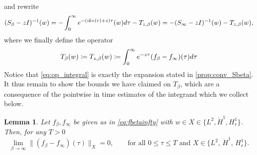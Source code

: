 \documentclass[11pt,reqno]{amsproc}
\def\dd{{\rm d}}
\def\e{{\rm e}}
\newtheorem{lemma}[proposition]{Lemma}
\theoremstyle{definition}
\newtheorem{remark}[proposition]{Remark}
\theoremstyle{definition}
\numberwithin{equation}{section}
\begin{document}
and rewrite  
\begin{equation}
\label{eq:op_integral}
(S_\beta-z I)^{-1}(w)=-\int_0^{\infty}\e^{-(ikv(r)+z)\tau}(w) \dd \tau-T_{z,\beta}(w)=-(S_\infty-zI)^{-1}(w)-T_{z,\beta}(w),
\end{equation}
where we finally define the operator
\begin{equation}
\label{def:T_beta}
    T_{\beta}(w)\coloneqq T_{z,\beta}(w)\coloneqq\int_0^{\infty}\e^{-z\tau}
({f}_\beta-f_\infty)(\tau)\dd \tau
\end{equation}
Notice that \cref{eq:op_integral} is exactly the expansion stated in \cref{prop:conv_Sbeta}. 
It thus remain to show the bounds we have claimed on $T_{\beta}$, which are a consequence of the pointwise in time estimates of the integrand which we collect below. 
\begin{lemma}
\label{lemma:small_tau}
    Let $f_\beta, f_\infty$ be given as in \cref{eq:fbetainfty} with $w\in X\in \{L^2,\dot{H}^1,H^1_r\}$. Then, for any $T>0$ 
    \begin{equation}
        \lim_{\beta\to \infty}\|(f_\beta-f_\infty)(\tau)\|_{X}=0, \qquad \text{for all } 0\leq \tau \leq T \text{ and } X\in \{L^2,\, \dot{H}^1, \, H^1_r\}.
    \end{equation}
\end{lemma}
\end{document}
